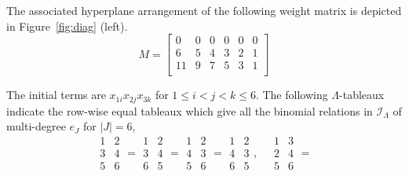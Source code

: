 \documentclass[ALCO,ThmDefs,Unicode,epreuves]{cedram}
\newcommand{\I}{\mathcal{I}}
\begin{document}
\begin{exam}
\label{exam:diag}
The associated hyperplane arrangement of the following weight matrix is depicted in Figure~\ref{fig:diag} (left).
\[
M=\begin{bmatrix}
 0 & 0 & 0 & 0 & 0 & 0 \\
 6& 5 & 4 & 3 & 2 & 1\\
 11 & 9 & 7 & 5 & 3 & 1 \\
\end{bmatrix}
\]

The initial terms are $x_{1i}x_{2j}x_{3k}$ for $1\leq i<j<k\leq 6$. The following $\Lambda$-tableaux indicate the row-wise equal tableaux which give all the binomial relations in $\I_{\Lambda}$ of multi-degree $e_J$ for $|J|=6$, %
\[
\begin{array}{c}1 \\ 3 \\5\end{array} 
\begin{array}{c}2 \\ 4 \\6\end{array}= 
\begin{array}{c}1 \\3 \\6\end{array}
\begin{array}{c}2 \\4 \\5\end{array} = 
\begin{array}{c}1 \\4 \\5\end{array} 
\begin{array}{c}2 \\3 \\6\end{array} = 
\begin{array}{c}1 \\4 \\6\end{array} 
\begin{array}{c} 2\\3 \\5\end{array} , \quad 
\begin{array}{c}1 \\2 \\5 \end{array} 
\begin{array}{c}3 \\4 \\6\end{array}= 
\]
\end{exam}
\end{document}
